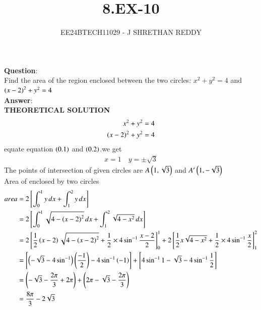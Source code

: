 \documentclass[journal]{IEEEtran}
\begin{document}

\vspace{3cm}

\title{8.EX-10}
\author{EE24BTECH11029 - J SHRETHAN REDDY}
\maketitle
{\let\newpage\relax\maketitle}

\renewcommand{\thefigure}{\theenumi}
\renewcommand{\thetable}{\theenumi}
\setlength{\intextsep}{10pt} %


\renewcommand{\thetable}{\theenumi}
\textbf{Question}:\\
Find the area of the region enclosed between the two circles: $x^2 + y^2 = 4$ and $\left(x-2\right)^2 + y^2 = 4$\\
\textbf{Answer}:\\
\textbf{THEORETICAL SOLUTION}
\begin{align}
    x^2 + y^2 &= 4\\
    \left(x-2\right)^2 +y^2 &=4
\end{align}
equate equation $\left(0.1\right)$ and $\left(0.2\right)$.we get
\begin{align}
    x = 1 \quad y = \pm\sqrt{3} 
\end{align}
The points of intersection of given circles are $A\left(1,\sqrt{3}\right)$ and $A^{\prime}\left(1,-\sqrt{3}\right)$ \\
Area of enclosed by two circles
\begin{align}
    area &= 2{}\left[\int_0^1 y\,dx +\int_1^2 y\,dx\right]\\
         &=2{}\left[\int_0^1 \sqrt{4-\left(x-2\right)^2}\,dx +\int_1^2 \sqrt{4-x^2}\,dx\right]\\
         &=2\left[ \frac{1}{2}\left(x-2\right)\sqrt{4-\left(x-2\right)^2}+\frac{1}{2}\times4\sin^{-1}\frac{x-2}{2}\right]_0^1 + 2\left[ \frac{1}{2}x\sqrt{4-x^2}+\frac{1}{2}\times4\sin^{-1}\frac{x}{2}\right]_1^2\\
         &=\left[\left(-\sqrt{3}-4\sin^{-1}\right)\left(\frac{-1}{2}\right)-4\sin^{-1}\left(-1\right)\right] + \left[4\sin^{-1}1-\sqrt{3}-4\sin^{-1}\frac{1}{2}\right]\\
         &=\left(-\sqrt{3}-\frac{2\pi}{3}+2\pi\right)+\left(2\pi-\sqrt{3}-\frac{2\pi}{3}\right)\\
         &=\frac{8\pi}{3}-2\sqrt{3}
\end{align}
\end{document}
